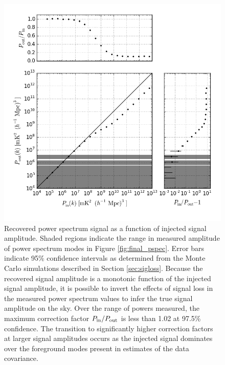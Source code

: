 \documentclass[twocolumn,numberedappendix]{emulateapj} \shorttitle{PSA64}
\begin{document}
\begin{figure}[!t]
\centering
\includegraphics[width=\columnwidth]{plots/sigloss.png}
\caption{
Recovered power spectrum signal as a function of injected signal amplitude.  Shaded regions
indicate the range in measured amplitude of power spectrum modes in Figure \ref{fig:final_pspec}.  
Error bars indicate 95\% confidence intervals as determined from the Monte Carlo simulations
described in Section \ref{sec:sigloss}.
Because
the recovered signal amplitude is a monotonic function of the injected signal amplitude,
it is possible to invert the effects of signal loss in the measured power spectrum values
to infer the true signal amplitude on the sky. Over the range of powers measured, the 
maximum correction factor $P_{\rm in}/P_{\rm out}$ is less than 1.02 at 97.5\% confidence.
The transition to significantly higher correction factors at larger signal amplitudes
occurs as the injected signal
dominates over the foreground modes present in estimates of the data covariance.
}\label{fig:signal_loss}
\end{figure}
\end{document}
